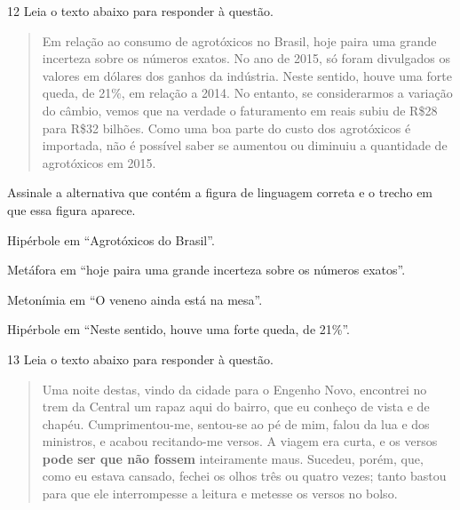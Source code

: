 \num{12} Leia o texto abaixo para responder à questão. 

\begin{quote}

Em relação ao consumo de agrotóxicos no Brasil, hoje paira uma grande
incerteza sobre os números exatos. No ano de 2015, só foram divulgados
os valores em dólares dos ganhos da indústria. Neste sentido, houve uma
forte queda, de 21\%, em relação a 2014. No entanto, se considerarmos a
variação do câmbio, vemos que na verdade o faturamento em reais subiu de
R\$28 para R\$32 bilhões. Como uma boa parte do custo dos agrotóxicos é
importada, não é possível saber se aumentou ou diminuiu a quantidade de
agrotóxicos em 2015.

\end{quote}


Assinale a alternativa que contém a figura de linguagem correta e o
trecho em que essa figura aparece.

\begin{escolha}

    \item Hipérbole em ``Agrotóxicos do Brasil''. 

    \item Metáfora em ``hoje paira uma grande incerteza sobre os números exatos''. 

    \item Metonímia em ``O veneno ainda está na mesa''. 

    \item Hipérbole em ``Neste sentido, houve uma forte queda, de 21\%''. 

\end{escolha}

\num{13} Leia o texto abaixo para responder à questão. 

\begin{quote}

Uma noite destas, vindo da cidade para o Engenho
Novo, encontrei no trem da Central um rapaz aqui do
bairro, que eu conheço de vista e de chapéu. 
Cumprimentou-me, sentou-se ao pé de mim, falou da lua
e dos ministros, e acabou recitando-me versos. A viagem 
era curta, e os versos \textbf{pode ser que não fossem} 
inteiramente maus. Sucedeu, porém, que, como eu estava 
cansado, fechei os olhos três ou quatro vezes; tanto 
bastou para que ele interrompesse a leitura e metesse 
os versos no bolso.

\end{quote}

